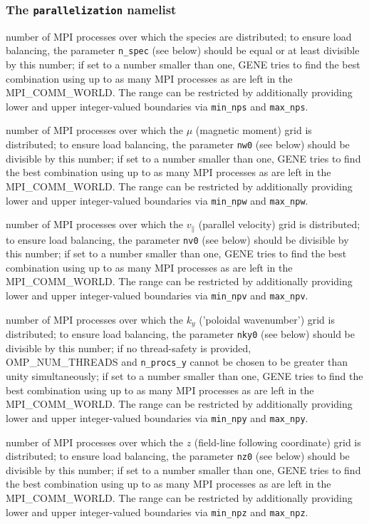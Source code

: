 \documentclass[12pt]{article}
\begin{document}
\subsubsection{The \texttt{parallelization} namelist}
\begin{description}
\hypertarget{parallelization_nml}{} 
\item[\texttt{n\_procs\_s [int 1]:}] number of MPI processes over which the species are distributed; 
to ensure load balancing, the parameter \texttt{n\_spec} (see below) should be equal or at least divisible 
by this number; 
if set to a number smaller than one, GENE tries to find the best combination using up to as many
MPI processes as are left in the MPI\_COMM\_WORLD. The range can be restricted by additionally providing 
lower and upper integer-valued boundaries via \texttt{min\_nps} and \texttt{max\_nps}.
\item[\texttt{n\_procs\_w [int 1]:}] number of MPI processes over which the $\mu$ (magnetic moment) grid
is distributed; to ensure load balancing, the parameter \texttt{nw0} (see below) should be divisible by
this number; 
if set to a number smaller than one, GENE tries to find the best combination using up to as many
MPI processes as are left in the MPI\_COMM\_WORLD. The range can be restricted by additionally providing 
lower and upper integer-valued boundaries via \texttt{min\_npw} and \texttt{max\_npw}.
\item[\texttt{n\_procs\_v [int 1]:}] number of MPI processes over which the $v_{\parallel}$ (parallel
velocity) grid is distributed; to ensure load balancing, the parameter \texttt{nv0} (see below) should
be divisible by this number; 
if set to a number smaller than one, GENE tries to find the best combination using up to as many
MPI processes as are left in the MPI\_COMM\_WORLD. The range can be restricted by additionally providing 
lower and upper integer-valued boundaries via \texttt{min\_npv} and \texttt{max\_npv}.
\item[\texttt{n\_procs\_y [int 1]:}] number of MPI processes over which the $k_y$ ('poloidal wavenumber')
grid is distributed; to ensure load balancing, the parameter \texttt{nky0} (see below) should be divisible
by this number; if no thread-safety is provided, OMP\_NUM\_THREADS and \texttt{n\_procs\_y} cannot be chosen to be
greater than unity simultaneously; 
if set to a number smaller than one, GENE tries to find the best combination using up to as many
MPI processes as are left in the MPI\_COMM\_WORLD. The range can be restricted by additionally providing 
lower and upper integer-valued boundaries via \texttt{min\_npy} and \texttt{max\_npy}.
\item[\texttt{n\_procs\_z [int 1]:}] number of MPI processes over which the $z$ (field-line following
coordinate) grid is distributed; to ensure load balancing, the parameter \texttt{nz0} (see below) 
should be divisible by this number; 
if set to a number smaller than one, GENE tries to find the best combination using up to as many
MPI processes as are left in the MPI\_COMM\_WORLD. The range can be restricted by additionally providing 
lower and upper integer-valued boundaries via \texttt{min\_npz} and \texttt{max\_npz}.
\end{description}
\end{document}
